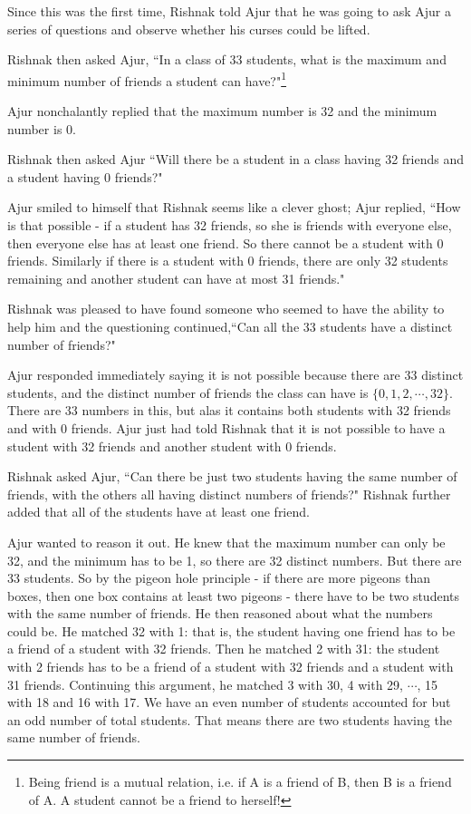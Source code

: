  Since this was the first time, Rishnak told Ajur that he was going to ask Ajur a series of questions and observe whether his curses could be lifted.
 
 Rishnak then asked Ajur, ``In a class of 33 students, what is the maximum and minimum number of friends a student can have?"\footnote{Being friend is a mutual relation, i.e. if A is a friend of B, then B is a friend of A. A student cannot be a friend to herself!}
 
 Ajur nonchalantly replied that the maximum number is 32 and the minimum number is 0.
 
 Rishnak then asked Ajur ``Will there be a student in a class having 32 friends and a student having 0 friends?"
 
 Ajur smiled to himself that Rishnak seems like a clever ghost; Ajur replied, ``How is that possible - if a student has 32 friends, so she is friends with everyone else, then everyone else has at least one friend. 
 So there cannot be a 
 student with 0 friends. Similarly if there is a student with 0 friends, there are only 32 students remaining and another student can have at most 31 friends."
 
 Rishnak was pleased to have found someone who seemed to have the ability to help him and the questioning continued,``Can all the 33 students have a distinct number of friends?"
 
 Ajur responded immediately saying it is not possible because there are 33 distinct students, and the distinct number of friends the class can have is $\{0,1,2,\cdots,32\}$. There are 33 numbers in this, but alas it contains both students with 32 friends and with 0 friends. Ajur just had told Rishnak that it is not possible to have a student with 32 friends and another student with 0 friends.
 
 Rishnak asked Ajur, ``Can there be just two students having the same number of friends, with the others all having distinct numbers of friends?" Rishnak further added that all of the students have at least one friend.
 
Ajur wanted to reason it out. He knew that the maximum number can only be 32, and the minimum has to be 1, so there are 32 distinct numbers. But there are 33 students. So by the pigeon hole principle - if there are more pigeons than boxes, then one box contains at least two pigeons - there have to be two students with the same number of friends.  He then reasoned about what the numbers could be. He matched 32 with 1: that is, the student having one friend has to be a friend of a student with 32 friends. Then he matched 2 with 31: the student with 2 friends has to be a friend of a student with 32 friends and a student with 31 friends. Continuing this argument, he matched 3 with 30, 4 with 29, $\cdots$, 15 with 18 and 16 with 17. We have an even number of students accounted for but an odd number of total students. That means there are two students having the same number of friends.

